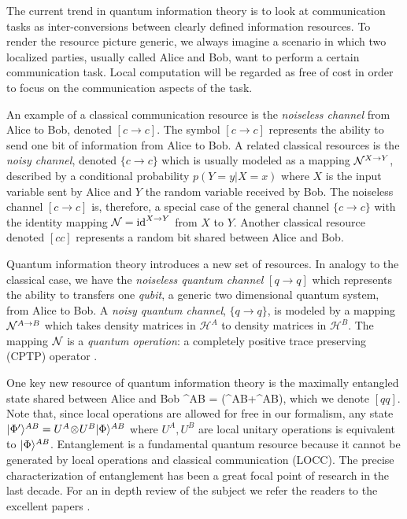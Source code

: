 \documentclass[aps,11pt,twoside,letterpaper]{article}
\def\cH{\mathcal{H}}
\theoremstyle{plain}
\theoremstyle{definition}
\begin{document}
			The current trend in quantum information theory is to look at communication tasks as inter-conversions
			between clearly defined information resources. 
			To render the resource picture generic, we always imagine a scenario in which two localized parties,
			usually called Alice and Bob, want to perform a certain communication task.
			Local computation will be regarded as free of cost in order to focus on the communication aspects 
			of the task. 
			
			An example of a classical communication resource is the \emph{noiseless channel} from 
			Alice to Bob, denoted $[c\to c]$. 
			The symbol $[c \to c]$ represents the ability to send one bit of information from Alice to Bob.
			A related classical resources is the \emph{noisy channel}, denoted $\{c\to c\}$ which is usually 
			modeled as a mapping ${\cal N}^{X \to Y}$, described by a conditional probability $p(Y=y|X=x)$ where
			$X$ is the input variable sent by Alice and $Y$ the random variable received by Bob.
			The noiseless channel $[c\to c]$ is, therefore, a special case of the general channel $\{c\to c\}$ 
			with the identity mapping ${\cal N} = \operatorname{id}^{X \to Y}$ from $X$ to $Y$.
			Another classical resource denoted $[cc]$ represents a random bit shared between Alice and Bob.
			
			Quantum information theory introduces a new set of resources. 
			In analogy to the classical case, we have the \emph{noiseless quantum channel} $[q \to q]$ which 
			represents the ability to transfers one \emph{qubit}, a generic two dimensional quantum system, 
			from Alice to Bob. 
			A \emph{noisy quantum channel}, $\{q \to q\}$, is modeled by a mapping ${\cal N}^{A \to B}$ 
			which takes density matrices in $\cH^A$ to density matrices in $\cH^B$.
			The mapping ${\cal N}$ is a \emph{quantum operation}: a completely positive trace preserving (CPTP) 
			operator \cite{NC04}.
			
			One key new resource of quantum information theory is the maximally entangled state shared between 
			Alice and Bob 
			\be
				\ket{\Phi}^{AB} = (^{AB}+^{AB}),
			\ee
			which we denote $[qq]$.  
			Note that, since local operations are allowed for free in our formalism, any state 
			$| \Phi' \rangle^{AB} = U^A\! \otimes\!U^B | \Phi \rangle^{AB}$ where $U^A,U^B$ are local unitary operations
			is equivalent to $| \Phi \rangle^{AB}$.
			Entanglement is a fundamental quantum resource because it cannot be generated by local operations and
			classical communication (LOCC). 
			The precise characterization of entanglement has been a great focal point of research in the last decade.
			For an in depth review of the subject we refer the readers to the excellent papers \cite{VP98, HHHH}.
			
\end{document}
